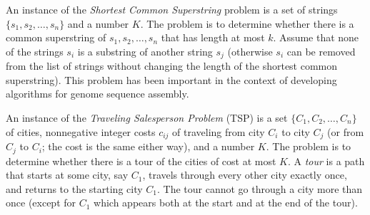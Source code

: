\documentclass[11pt]{article}
\begin{document}
An instance of the \emph{Shortest Common Superstring} problem is a set of
strings $\{s_1, s_2, \ldots, s_n\}$ and a number $K$.
The problem is to determine whether there is a
common superstring of $s_1, s_2, \ldots, s_n$ that has length at most
$k$.  Assume that none of the strings $s_i$ is a substring of another
string $s_j$ (otherwise $s_i$ can be removed from the list of strings
without changing the length of the shortest common superstring). This
problem has been important in the context of developing algorithms for
genome sequence assembly.

An instance of the \emph{Traveling Salesperson Problem} (TSP) is a set $\{
C_1, C_2, \ldots, C_n \}$ of cities, nonnegative integer costs
$c_{ij}$ of traveling from city $C_i$ to city $C_j$ (or from $C_j$ to
$C_i$; the cost is the same either way), and a number $K$.  The
problem is to determine whether there is a tour of the cities of cost
at most $K$.  A \emph{tour} is a path that starts at some city, say $C_1$,
travels through every other city exactly once, and returns to the
starting city $C_1$. The tour cannot go through a city more than once
(except for $C_1$ which appears both at the start and at the end of
the tour).
\end{document}
